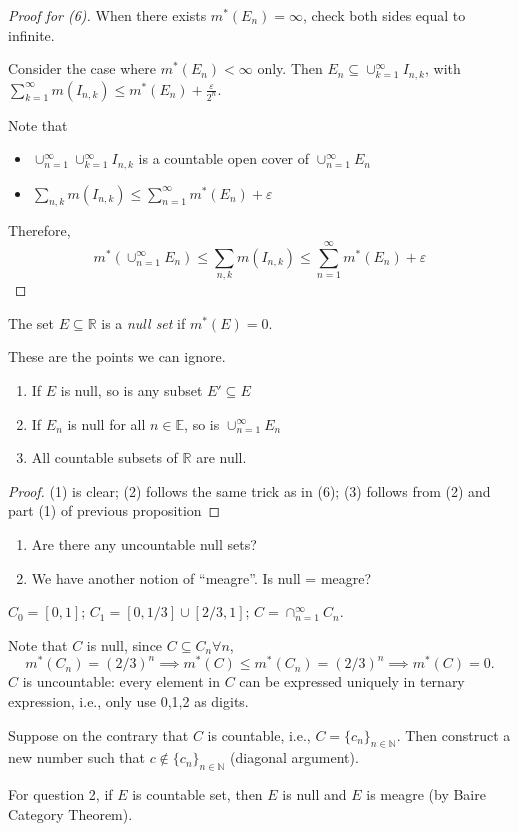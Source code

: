 \begin{proof}[Proof for (6)]
When there exists $m^*(E_n)=\infty$, check both sides equal to infinite.

Consider the case where $m^*(E_n)<\infty$ only.
Then $E_n\subseteq\cup_{k=1}^\infty I_{n,k}$, with $\sum_{k=1}^\infty m(I_{n,k})\le m^*(E_n) + \frac{\varepsilon}{2^n}$.

Note that 
\begin{itemize}
\item
$\cup_{n=1}^\infty\cup_{k=1}^\infty I_{n,k}$ is a countable open cover of $\cup_{n=1}^\infty E_n$
\item
$\sum_{n,k}m(I_{n,k})\le \sum_{n=1}^\infty m^*(E_n)+\varepsilon$
\end{itemize}
Therefore,
\[
m^*(\cup_{n=1}^\infty E_n)\le \sum_{n,k}m(I_{n,k})\le\sum_{n=1}^\infty m^*(E_n)+\varepsilon
\]


\end{proof}


\begin{definition}
The set $E\subseteq\mathbb{R}$ is a \emph{null set} if
$m^*(E)=0$.

These are the points we can ignore.
\end{definition}
\begin{corollary}
\begin{enumerate}
\item
If $E$ is null, so is any subset $E'\subseteq E$
\item
If $E_n$ is null for all $n\in\mathbb{E}$, so is $\cup_{n=1}^\infty E_n$
\item
All countable subsets of $\mathbb{R}$ are null.
\end{enumerate}
\end{corollary}
\begin{proof}
(1) is clear; (2) follows the same trick as in (6);
(3) follows from (2) and part (1) of previous proposition
\end{proof}

\begin{remark}
\begin{enumerate}
\item
Are there any uncountable null sets?
\item
We have another notion of ``meagre''. Is null = meagre?
\end{enumerate}
\end{remark}
\begin{example}
$C_0=[0,1]$;
$C_1=[0,1/3]\cup[2/3,1]$;
$C=\cap_{n=1}^\infty C_n$.

Note that $C$ is null, since $C\subseteq C_n\forall n$,
\[
m^*(C_n) = (2/3)^n\implies
m^*(C)\le m^*(C_n) = (2/3)^n\implies
m^*(C)=0.
\]
$C$ is uncountable:
every element in $C$ can be expressed uniquely in ternary expression, i.e., only use 0,1,2 as digits.

Suppose on the contrary that $C$ is countable, i.e., $C=\{c_n\}_{n\in\mathbb{N}}.$
Then construct a new number such that $c\notin \{c_n\}_{n\in\mathbb{N}}$ (diagonal argument).
\end{example}
For question 2, if $E$ is countable set, then $E$ is null and $E$ is meagre (by Baire Category Theorem).

